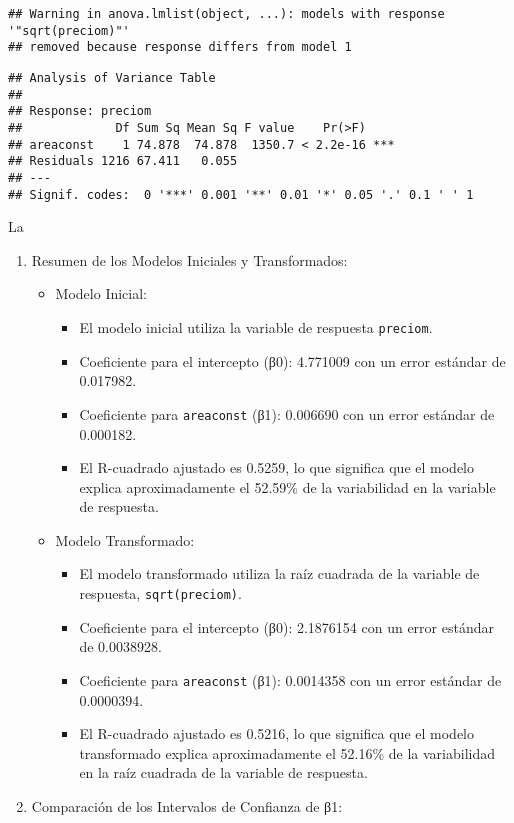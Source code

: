 \documentclass[
]{article}
\providecommand{\tightlist}{%
  \setlength{\itemsep}{0pt}\setlength{\parskip}{0pt}}
\begin{document}
\begin{verbatim}
## Warning in anova.lmlist(object, ...): models with response '"sqrt(preciom)"'
## removed because response differs from model 1
\end{verbatim}

\begin{verbatim}
## Analysis of Variance Table
## 
## Response: preciom
##             Df Sum Sq Mean Sq F value    Pr(>F)    
## areaconst    1 74.878  74.878  1350.7 < 2.2e-16 ***
## Residuals 1216 67.411   0.055                      
## ---
## Signif. codes:  0 '***' 0.001 '**' 0.01 '*' 0.05 '.' 0.1 ' ' 1
\end{verbatim}

La

\begin{enumerate}
\def\labelenumi{\arabic{enumi}.}
\tightlist
\item
  Resumen de los Modelos Iniciales y Transformados:

  \begin{itemize}
  \tightlist
  \item
    Modelo Inicial:

    \begin{itemize}
    \tightlist
    \item
      El modelo inicial utiliza la variable de respuesta
      \texttt{preciom}.
    \item
      Coeficiente para el intercepto (β0): 4.771009 con un error
      estándar de 0.017982.
    \item
      Coeficiente para \texttt{areaconst} (β1): 0.006690 con un error
      estándar de 0.000182.
    \item
      El R-cuadrado ajustado es 0.5259, lo que significa que el modelo
      explica aproximadamente el 52.59\% de la variabilidad en la
      variable de respuesta.
    \end{itemize}
  \item
    Modelo Transformado:

    \begin{itemize}
    \tightlist
    \item
      El modelo transformado utiliza la raíz cuadrada de la variable de
      respuesta, \texttt{sqrt(preciom)}.
    \item
      Coeficiente para el intercepto (β0): 2.1876154 con un error
      estándar de 0.0038928.
    \item
      Coeficiente para \texttt{areaconst} (β1): 0.0014358 con un error
      estándar de 0.0000394.
    \item
      El R-cuadrado ajustado es 0.5216, lo que significa que el modelo
      transformado explica aproximadamente el 52.16\% de la variabilidad
      en la raíz cuadrada de la variable de respuesta.
    \end{itemize}
  \end{itemize}
\item
  Comparación de los Intervalos de Confianza de β1:


\end{enumerate}
\end{document}
